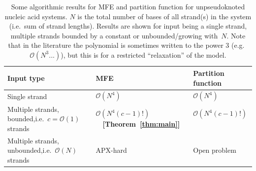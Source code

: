 \documentclass[11pt,letterpaper]{article}  \usepackage[margin=1in]{geometry}
\theoremstyle{definition}  \newtheorem{Definition}[theorem]{Definition}
\begin{document}
\begin{table}[t]
	\centering
	\begin{tabular}{ p{5cm}||p{5cm}|p{5cm}  }


		Input type& MFE & Partition function\\ 
		
		\hline\hline
		
		Single strand   &   $\mathcal{O}(N^4)$ \ \   \cite{zukeroptimal,zukerrna, nussinov1978algorithms, nussinov1980fast,waterman1986rapid}  &   $\mathcal{O}(N^4)$ \ \  \cite{mccaskill1990equilibrium}     \\  \hline
		Multiple strands, bounded,\newline i.e.~$c= \mathcal{O}(1)$ strands &  $\mathcal{O}(N^4 (c-1)!)$ \ \  {\bf [Theorem~\ref{thm:main}]}   &   $\mathcal{O}(N^4 (c-1)!)$  \ \ \  \cite{dirks2007thermodynamic}\footref{ft:N3}    \\ \hline
		Multiple strands, unbounded,\newline i.e.~$\mathcal{O}(N)$ strands &  APX-hard \ \   \cite{condon2021predicting}  &  Open problem   \\ \hline
	\end{tabular}\vspace{-1.5ex}
	\caption{\label{table}\small
		Some algorithmic results for MFE and partition function for unpseudoknoted nucleic acid systems.
		$N$ is the total number of bases of all strand(s) in the system (i.e.~sum of strand lengths).
		Results are shown for input being a single strand, 
		multiple strands bounded by a constant or unbounded/growing with~$N$. 
		Note that in the literature the polynomial is sometimes written to the power 3 (e.g.~$\mathcal{O}(N^3 ...)$), but this is for a restricted ``relaxation'' of the model.  
	}
\end{table}
\end{document}
